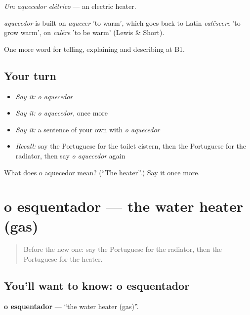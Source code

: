 \emph{Um aquecedor elétrico} — an electric heater.

\begin{cousinweb}
\emph{aquecedor} is built on \emph{aquecer} 'to warm', which goes back to Latin \emph{calēscere} 'to grow warm', on \emph{calēre} 'to be warm' (Lewis \& Short).
\end{cousinweb}

\begin{grammarlens}[title={What you've built}]
One more word for telling, explaining and describing at B1.
\end{grammarlens}

\subsection*{Your turn}
\begin{itemize}
\raggedright
  \item \emph{Say it:} \emph{o aquecedor}
  \item \emph{Say it:} \emph{o aquecedor}, once more
  \item \emph{Say it:} a sentence of your own with \emph{o aquecedor}
  \item \emph{Recall:} say the Portuguese for the toilet cistern, then the Portuguese for the radiator, then say \emph{o aquecedor} again
\end{itemize}

\begin{tcolorbox}[breakable,colback=teal!4,colframe=teal!35!black,title={Before you move on}]
What does o aquecedor mean? (\textquotedblleft{}The heater\textquotedblright{}.) Say it once more.
\end{tcolorbox}
\section[o esquentador]{o esquentador — the water heater (gas)}

\label{lesson:PT-C431-esquentador}



\begin{quote}
Before the new one: say the Portuguese for the radiator, then the Portuguese for the heater.
\end{quote}

\subsection*{You'll want to know: o esquentador}
\textbf{o esquentador} — \textquotedblleft{}the water heater (gas)\textquotedblright{}.

